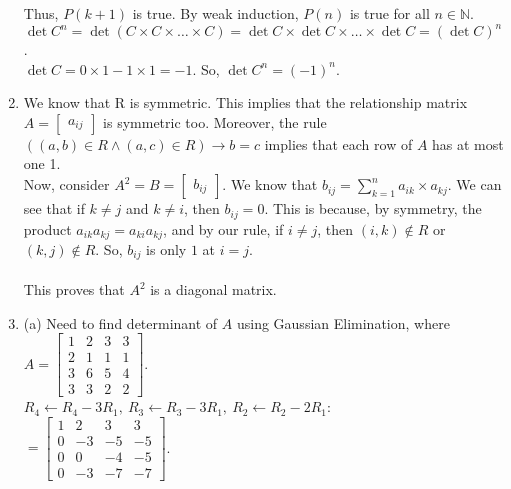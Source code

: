 \documentclass[a4paper]{article}
\begin{document}
\begin{enumerate}
Thus, $P(k+1)$ is true. By weak induction, $P(n)$ is true for all $n \in \mathbb{N}$.\\

$\det C^n = \det (C \times C \times \dots \times C) = \det C \times \det C \times \dots \times \det C = (\det C)^n$.\\
$\det C = 0 \times 1 - 1 \times 1 = -1$. So, $\det C^n = (-1)^n$.\\

\item We know that R is symmetric. This implies that the relationship matrix $A = \begin{bmatrix}a_{ij}\end{bmatrix}$ is symmetric too. Moreover, the rule $((a, b) \in R \land (a, c) \in R) \rightarrow b = c$ implies that each row of $A$ has at most one 1.\\

Now, consider $A^2 = B = \begin{bmatrix}b_{ij}\end{bmatrix}$. We know that $b_{ij} = \sum_{k=1}^{n} a_{ik} \times a_{kj}$. We can see that if $k \neq j$ and $k \neq i$, then $b_{ij} = 0$. This is because, by symmetry, the product $a_{ik}a_{kj} = a_{ki}a_{kj}$, and by our rule, if $i \neq j$, then $(i, k) \notin R$ or $(k, j) \notin R$. So, $b_{ij}$ is only $1$ at $i = j$.\\
\\
This proves that $A^2$ is a diagonal matrix.\\

\item (a) Need to find determinant of $A$ using Gaussian Elimination, where $A = \begin{bmatrix}1 & 2 & 3 & 3\\2 & 1 & 1 & 1\\3 & 6 & 5 & 4\\3 & 3 & 2 & 2\end{bmatrix}$.\\

$R_4 \leftarrow R_4 - 3R_1,\ R_3 \leftarrow R_3 - 3R_1,\ R_2 \leftarrow R_2 - 2R_1$:\\
$= \begin{bmatrix}1 & 2 & 3 & 3\\0 & -3 & -5 & -5\\0 & 0 & -4 & -5\\0 & -3 & -7 & -7\end{bmatrix}$.\\


\end{enumerate}
\end{document}
